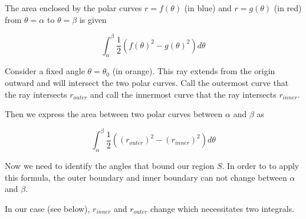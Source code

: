 \documentclass{ximera}
\begin{document}
\begin{exercise}
\begin{exercise}
\begin{hint}
\begin{image}
\end{image}


The area enclosed by the polar curves $r=f(\theta)$ (in blue) and $r=g(\theta)$ (in red) from $\theta=\alpha$ to $\theta=\beta$ is given 

\[
\int_{\alpha}^{\beta} \frac{1}{2} (f(\theta)^2 -g(\theta)^2) d\theta
\]

Consider a fixed angle $\theta=\theta_{0}$ (in orange). This ray extends from the origin outward and will intersect the two polar curves. Call the outermost curve that the ray intersects
$r_{outer}$ and call the innermost curve that the ray intersects $r_{inner}$. 

Then we express the area between two polar curves between $\alpha$ and $\beta$ as 

\[
\int_{\alpha}^{\beta} \frac{1}{2}( (r_{outer})^2 -(r_{inner})^2) d\theta
\]

Now we need to identify the angles that bound our region $S$. In order to to apply this formula, the outer boundary and inner boundary can not change between $\alpha$ and $\beta$. 


In our case (see below), $r_{inner}$ and $r_{outer}$ change which necessitates two integrals. 



\end{hint}
\end{exercise}
\end{exercise}
\end{document}
